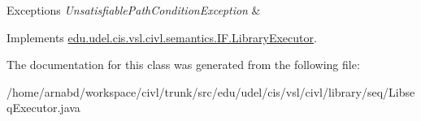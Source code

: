 \begin{DoxyExceptions}{Exceptions}
{\em Unsatisfiable\+Path\+Condition\+Exception} & \\
\hline
\end{DoxyExceptions}


Implements \hyperlink{interfaceedu_1_1udel_1_1cis_1_1vsl_1_1civl_1_1semantics_1_1IF_1_1LibraryExecutor_a383136ab6e875742f46b5dbd94673984}{edu.\+udel.\+cis.\+vsl.\+civl.\+semantics.\+I\+F.\+Library\+Executor}.



The documentation for this class was generated from the following file\+:\begin{DoxyCompactItemize}
\item 
/home/arnabd/workspace/civl/trunk/src/edu/udel/cis/vsl/civl/library/seq/Libseq\+Executor.\+java\end{DoxyCompactItemize}
